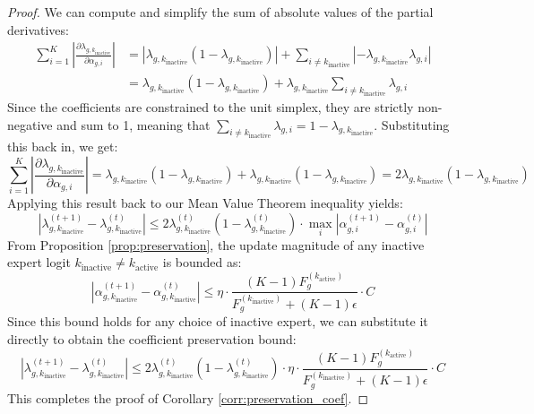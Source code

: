 \documentclass{article}
\theoremstyle{plain}
\theoremstyle{definition}
\theoremstyle{remark}
\begin{document}
\begin{proof}
We can compute and simplify the sum of absolute values of the partial derivatives:
\begin{align}
    \sum_{i=1}^K \left| \frac{\partial \lambda_{g, k_{\text{inactive}}}}{\partial \alpha_{g, i}} \right| &= \left| \lambda_{g, k_{\text{inactive}}} (1 - \lambda_{g, k_{\text{inactive}}}) \right| + \sum_{i \neq k_{\text{inactive}}} \left| -\lambda_{g, k_{\text{inactive}}} \lambda_{g, i} \right| \\
    &= \lambda_{g, k_{\text{inactive}}} (1 - \lambda_{g, k_{\text{inactive}}}) + \lambda_{g, k_{\text{inactive}}} \sum_{i \neq k_{\text{inactive}}} \lambda_{g, i}
\end{align}
Since the coefficients are constrained to the unit simplex, they are strictly non-negative and sum to 1, meaning that $\sum_{i \neq k_{\text{inactive}}} \lambda_{g, i} = 1 - \lambda_{g, k_{\text{inactive}}}$. Substituting this back in, we get:
\begin{equation}
    \sum_{i=1}^K \left| \frac{\partial \lambda_{g, k_{\text{inactive}}}}{\partial \alpha_{g, i}} \right| = \lambda_{g, k_{\text{inactive}}} (1 - \lambda_{g, k_{\text{inactive}}}) + \lambda_{g, k_{\text{inactive}}} (1 - \lambda_{g, k_{\text{inactive}}}) = 2\lambda_{g, k_{\text{inactive}}} (1 - \lambda_{g, k_{\text{inactive}}})
\end{equation}
Applying this result back to our Mean Value Theorem inequality yields:
\begin{equation}
    \left| \lambda^{(t+1)}_{g, k_{\text{inactive}}} - \lambda^{(t)}_{g, k_{\text{inactive}}} \right| \leq 2 \lambda^{(t)}_{g, k_{\text{inactive}}} (1 - \lambda^{(t)}_{g, k_{\text{inactive}}}) \cdot \max_{i} \left| \alpha^{(t+1)}_{g, i} - \alpha^{(t)}_{g, i} \right|
\end{equation}
From Proposition \ref{prop:preservation}, the update magnitude of any inactive expert logit $k_{\text{inactive}} \neq k_{\text{active}}$ is bounded as:
\begin{equation}
    \left| \alpha^{(t+1)}_{g, k_{\text{inactive}}} - \alpha^{(t)}_{g, k_{\text{inactive}}} \right| \leq \eta \cdot \frac{(K-1) F^{(k_{\text{active}})}_g}{F^{(k_{\text{inactive}})}_g + (K-1)\epsilon} \cdot C
\end{equation}
Since this bound holds for any choice of inactive expert, we can substitute it directly to obtain the coefficient preservation bound:
\begin{equation}
    \left| \lambda^{(t+1)}_{g, k_{\text{inactive}}} - \lambda^{(t)}_{g, k_{\text{inactive}}} \right| \leq 2 \lambda^{(t)}_{g, k_{\text{inactive}}} (1 - \lambda^{(t)}_{g, k_{\text{inactive}}}) \cdot \eta \cdot \frac{(K-1) F^{(k_{\text{active}})}_g}{F^{(k_{\text{inactive}})}_g + (K-1)\epsilon} \cdot C
\end{equation}
This completes the proof of Corollary \ref{corr:preservation_coef}.
\end{proof}
\end{document}
